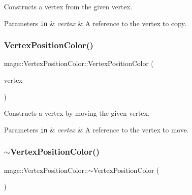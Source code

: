 Constructs a vertex from the given vertex.


\begin{DoxyParams}[1]{Parameters}
\mbox{\tt in}  & {\em vertex} & A reference to the vertex to copy. \\
\hline
\end{DoxyParams}
\hypertarget{structmage_1_1_vertex_position_color_a0fdc77311a4b9b1c97f4f7ab83990d26}{}\label{structmage_1_1_vertex_position_color_a0fdc77311a4b9b1c97f4f7ab83990d26} 
\subsubsection{\texorpdfstring{Vertex\+Position\+Color()}{VertexPositionColor()}\hspace{0.1cm}{\footnotesize\ttfamily [4/4]}}
{\footnotesize\ttfamily mage\+::\+Vertex\+Position\+Color\+::\+Vertex\+Position\+Color (\begin{DoxyParamCaption}\item[{\hyperlink{structmage_1_1_vertex_position_color}{Vertex\+Position\+Color} \&\&}]{vertex }\end{DoxyParamCaption})\hspace{0.3cm}{\ttfamily [default]}}

Constructs a vertex by moving the given vertex.


\begin{DoxyParams}[1]{Parameters}
\mbox{\tt in}  & {\em vertex} & A reference to the vertex to move. \\
\hline
\end{DoxyParams}
\hypertarget{structmage_1_1_vertex_position_color_a18c4400389dfd47482a7d0901d904aec}{}\label{structmage_1_1_vertex_position_color_a18c4400389dfd47482a7d0901d904aec} 
\subsubsection{\texorpdfstring{$\sim$\+Vertex\+Position\+Color()}{~VertexPositionColor()}}
{\footnotesize\ttfamily mage\+::\+Vertex\+Position\+Color\+::$\sim$\+Vertex\+Position\+Color (\begin{DoxyParamCaption}{ }\end{DoxyParamCaption})\hspace{0.3cm}{\ttfamily [default]}}


